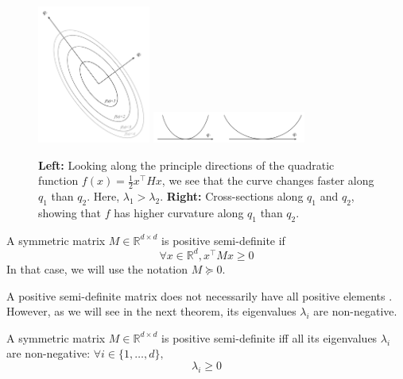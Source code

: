 \documentclass{article}
\newcommand{\R}{\mathbb{R}}
\begin{document}
\begin{figure}[ht]
\centering
    \includegraphics[align=c,width=0.33\textwidth]{figures/curvature2.pdf}\qquad\qquad
    \includegraphics[align=c,width=0.45\textwidth]{figures/curvature.pdf}
    \caption[]{\textbf{Left:} Looking along the principle directions of the quadratic function $f(x) = \frac{1}{2}x^\top Hx $, we see that the curve changes faster along $q_1$ than $q_2$. Here\footnotemark[4], $\lambda_1 > \lambda_2$. \textbf{Right:} Cross-sections along $q_1$ and $q_2$, showing that $f$ has higher curvature along $q_1$ than $q_2$.}
        \label{fig:curvature2}
\end{figure}

\begin{defn}
A symmetric matrix $M\in \R^{d\times d}$ is positive semi-definite if
\[
\forall x\in \R^d, x^\top M x \geq 0
\]
In that case, we will use the notation $M \succeq 0$.
\end{defn}{}

A positive semi-definite matrix does not necessarily have all positive elements \footnotemark[5]. However, as we will see in the next theorem, its eigenvalues $\lambda_i$ are non-negative.\\

\begin{thm}
A symmetric matrix $M\in \R^{d\times d}$ is positive semi-definite iff all its eigenvalues $\lambda_i$ are non-negative: $\forall i \in \{1,\ldots,d\},$
\[
    \lambda_i \geq 0
\]
\end{thm}{}
\end{document}
